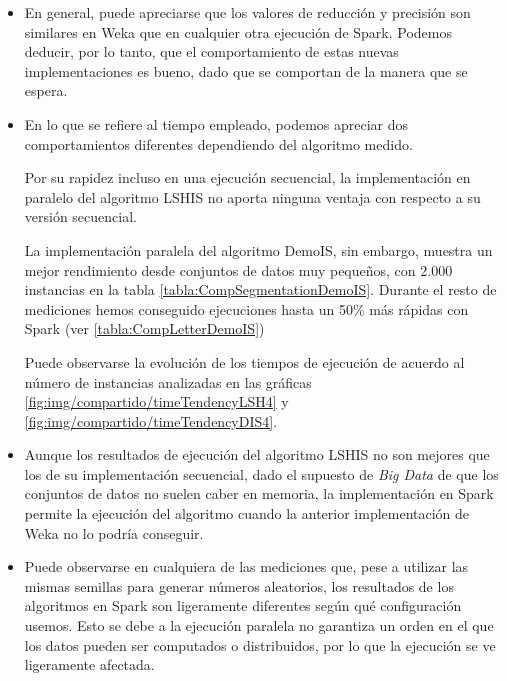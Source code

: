 \begin{itemize}
	\item En general, puede apreciarse que los valores de reducción y precisión son similares en Weka que en cualquier otra ejecución de Spark. Podemos deducir, por lo tanto, que el comportamiento de estas nuevas implementaciones es bueno, dado que se comportan de la manera que se espera.
	
	\item En lo que se refiere al tiempo empleado, podemos apreciar dos comportamientos diferentes dependiendo del algoritmo medido.
	
	Por su rapidez incluso en una ejecución secuencial, la implementación en paralelo del algoritmo LSHIS no aporta ninguna ventaja con respecto a su versión secuencial.
	
	La implementación paralela del algoritmo DemoIS, sin embargo, muestra un mejor rendimiento desde conjuntos de datos muy pequeños, con 2.000 instancias en la tabla \ref{tabla:CompSegmentationDemoIS}. Durante el resto de mediciones hemos conseguido ejecuciones hasta un 50\% más rápidas con Spark (ver \ref{tabla:CompLetterDemoIS})
	
	Puede observarse la evolución de los tiempos de ejecución de acuerdo al número de instancias analizadas en las gráficas \ref{fig:img/compartido/timeTendencyLSH4} y \ref{fig:img/compartido/timeTendencyDIS4}.
	
	
	
	\item Aunque los resultados de ejecución del algoritmo LSHIS no son mejores que los de su implementación secuencial, dado el supuesto de \textit{Big Data} de que los conjuntos de datos no suelen caber en memoria, la implementación en Spark permite la ejecución del algoritmo cuando la anterior implementación de Weka no lo podría conseguir.
	
	\item Puede observarse en cualquiera de las mediciones que, pese a utilizar las mismas semillas para generar números aleatorios, los resultados de los algoritmos en Spark son ligeramente diferentes según qué configuración usemos. Esto se debe a la ejecución paralela no garantiza un orden en el que los datos pueden ser computados o distribuidos, por lo que la ejecución se ve ligeramente afectada.
	

\end{itemize}
